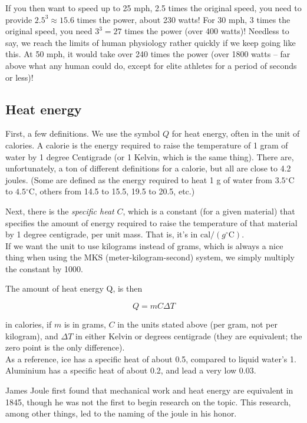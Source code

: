 If you then want to speed up to 25 mph, 2.5 times the original speed, you need to provide $2.5^{3} \approx 15.6$ times the power, about 230 watts! For 30 mph, 3 times the original speed, you need $3^3 = 27$ times the power (over 400 watts)! Needless to say, we reach the limits of human physiology rather quickly if we keep going like this. At 50 mph, it would take over 240 times the power (over 1800 watts -- far above what any human could do, except for elite athletes for a period of seconds or less)!

\subsection{Heat energy}

First, a few definitions. We use the symbol $Q$ for heat energy, often in the unit of calories. A calorie is the energy required to raise the temperature of 1 gram of water by 1 degree Centigrade (or 1 Kelvin, which is the same thing). There are, unfortunately, a ton of different definitions for a calorie, but all are close to 4.2 joules. (Some are defined as the energy required to heat 1 g of water from $3.5 {}^\circ$C to $4.5 {}^\circ$C, others from 14.5 to 15.5, 19.5 to 20.5, etc.)

Next, there is the \emph{specific heat} $C$, which is a constant (for a given material) that specifies the amount of energy required to raise the temperature of that material by 1 degree centigrade, per unit mass. That is, it's in $\text{cal}/(g {}^\circ\text{C})$.\\
If we want the unit to use kilograms instead of grams, which is always a nice thing when using the MKS (meter-kilogram-second) system, we simply multiply the constant by 1000.

The amount of heat energy Q, is then

\begin{equation}
Q = m C \Delta T
\end{equation}

in calories, if $m$ is in grams, $C$ in the units stated above (per gram, not per kilogram), and $\Delta T$ in either Kelvin or degrees centigrade (they are equivalent; the zero point is the only difference).\\
As a reference, ice has a specific heat of about 0.5, compared to liquid water's 1. Aluminium has a specific heat of about 0.2, and lead a very low 0.03.

James Joule first found that mechanical work and heat energy are equivalent in 1845, though he was not the first to begin research on the topic. This research, among other things, led to the naming of the joule in his honor.

